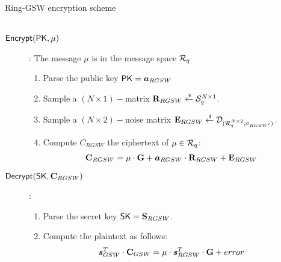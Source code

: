 \begin{subsection}{Ring-GSW encryption scheme~\cite{DBLP:journals/tc/KhedrGV16}}
\begin{description}
\begin{enumerate}
\begin{align*}
      \end{align*}
    \end{enumerate}
  \item[${\mathsf{Encrypt}}(\mathsf{PK}, \mu)$]: The message $\mu$ is in the message space ${\mathcal{R}}_q$
    \begin{enumerate}
    \item Parse the public key $\PK = \vec{a}_{RGSW}$
    \item Sample a $(N \times 1)-$matrix $\mathbf{R}_{RGSW} \stackrel{{\scriptscriptstyle \mkern4mu \$}}{\gets} \mathcal{S}_q^{N \times 1}$.
    \item Sample a $(N \times 2)-$noise matrix $\mathbf{E}_{RGSW} \stackrel{{\scriptscriptstyle \mkern4mu \$}}{\gets} \mathcal{D}_{({\mathcal{R}}_q^{N \times 2}, \sigma_{RGSW'})}$.
    \item Compute $C_{RGSW}$ the ciphertext of $\mu \in {\mathcal{R}}_q$:
      \begin{align*}
        \mat{C}_{RGSW} &= \mu \cdot \mat{G} + \vec{a}_{RGSW} \cdot \mat{R}_{RGSW} + \mat{E}_{RGSW}
      \end{align*}
    \end{enumerate}
  \item[${\mathsf{Decrypt}}(\mathsf{SK}, \mathbf{C}_{RGSW})$]:
    \begin{enumerate}
    \item Parse the secret key $\mathsf{SK} = \mathbf{S}_{RGSW}$.
    \item Compute the plaintext as follows:
      \begin{align*}
        \vec{s}_{GSW}^T \cdot \mat{C}_{GSW} &= \mu \cdot \vec{s}_{RGSW}^T \cdot \mat{G} + error 
      \end{align*}
    
    \end{enumerate}
  \end{description}
  
\end{subsection}

